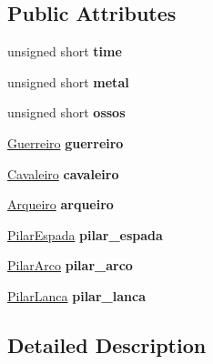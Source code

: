 \subsection*{Public Attributes}
\begin{DoxyCompactItemize}
\item 
\mbox{\label{class_player_a953244bbf0e0326076c22ba47c11a7cb}} 
unsigned short {\bfseries time}
\item 
\mbox{\label{class_player_a33608a1ac91b463c5d4f0d75e6ed8724}} 
unsigned short {\bfseries metal}
\item 
\mbox{\label{class_player_a147e27fdd4a9e19654ed924e14eced3a}} 
unsigned short {\bfseries ossos}
\item 
\mbox{\label{class_player_a22564346bf7ddc4a9d6c99a265459067}} 
\mbox{\hyperlink{class_guerreiro}{Guerreiro}} {\bfseries guerreiro}
\item 
\mbox{\label{class_player_a92dffc00e1f3e6ad24bd0e9432f336cf}} 
\mbox{\hyperlink{class_cavaleiro}{Cavaleiro}} {\bfseries cavaleiro}
\item 
\mbox{\label{class_player_a9aeeec934470acf8f4eda1841abf4ed2}} 
\mbox{\hyperlink{class_arqueiro}{Arqueiro}} {\bfseries arqueiro}
\item 
\mbox{\label{class_player_a1b5158c5e932c8f782bb249680188301}} 
\mbox{\hyperlink{class_pilar_espada}{Pilar\+Espada}} {\bfseries pilar\+\_\+espada}
\item 
\mbox{\label{class_player_a2b30942a91b8d0342ec6e00d1f3a32f6}} 
\mbox{\hyperlink{class_pilar_arco}{Pilar\+Arco}} {\bfseries pilar\+\_\+arco}
\item 
\mbox{\label{class_player_a7b3f7a6b8ca2194cfb0af6dc783d790c}} 
\mbox{\hyperlink{class_pilar_lanca}{Pilar\+Lanca}} {\bfseries pilar\+\_\+lanca}
\end{DoxyCompactItemize}


\subsection{Detailed Description}



